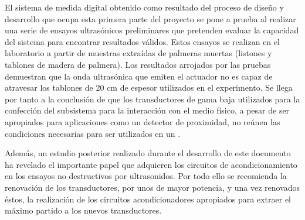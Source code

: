 El sistema de medida digital obtenido como resultado del proceso de diseño
y desarrollo que ocupa esta primera parte del proyecto se pone a prueba al
realizar una serie de ensayos ultrasónicos preliminares que pretenden
evaluar la capacidad del sistema para encontrar resultados válidos. Estos
ensayos se realizan en el laboratorio a partir de muestras extraídas de
palmeras muertas (listones y tablones de madera de palmera). Los resultados
arrojados por las pruebas demuestran que la onda ultrasónica que emiten el
actuador no es capaz de atravesar los tablones de 20 cm de espesor
utilizados en el experimento. Se llega por tanto a la conclusión de que los
transductores de gama baja utilizados para la confección del subsistema
para la interacción con el medio físico, a pesar de ser apropiados para
aplicaciones como un detector de proximidad, no reúnen las condiciones
necesarias para ser utilizados en un .

Además, un estudio posterior realizado durante el desarrollo de este
documento ha revelado el importante papel que adquieren los circuitos de
acondicionamiento en los ensayos no destructivos por ultrasonidos. Por todo
ello se recomienda la renovación de los transductores, por unos de mayor
potencia, y una vez renovados éstos, la realización de los circuitos
acondicionadores apropiados para extraer el máximo partido a los nuevos
transductores.
